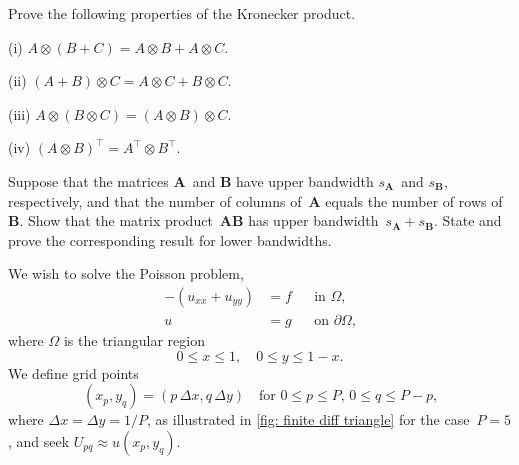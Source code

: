 \begin{Exercises}
\exercise
Prove the following properties of the Kronecker product.
\begin{description}
\item{(i)} $A\otimes(B+C)=A\otimes B+A\otimes C$.
\item{(ii)} $(A+B)\otimes C=A\otimes C+B\otimes C$.
\item{(iii)} $A\otimes(B\otimes C)=(A\otimes B)\otimes C$.
\item{(iv)} $(A\otimes B)^\top=A^\top\otimes B^\top$.
\end{description}

\exercise
Suppose that the matrices $\boldsymbol{A}$~and $\boldsymbol{B}$ have upper 
bandwidth $s_{\boldsymbol{A}}$~and $s_{\boldsymbol{B}}$, respectively, and that 
the number of columns of~$\boldsymbol{A}$ equals the number of rows 
of~$\boldsymbol{B}$.  Show that the matrix 
product~$\boldsymbol{A}\boldsymbol{B}$ has upper 
bandwidth~$s_{\boldsymbol{A}}+s_{\boldsymbol{B}}$.  State and prove the 
corresponding result for lower bandwidths.

\exercise
We wish to solve the Poisson problem,
\[
\begin{aligned}
-(u_{xx}+u_{yy})&=f&&\text{in $\Omega$,}\\
u&=g&&\text{on $\partial\Omega$,}
\end{aligned}
\]
where $\Omega$ is the triangular region
\[
0\le x\le1,\quad 0\le y\le 1-x.
\]
We define grid points
\[
(x_p,y_q)=(p\,\Delta x,q\,\Delta y)
        \quad\text{for $0\le p\le P$, $0\le q\le P-p$,}
\]
where $\Delta x=\Delta y=1/P$, as illustrated in 
\cref{fig: finite diff triangle} for the case~$P=5$, and seek
$U_{pq}\approx u(x_p,y_q)$.


\end{Exercises}
